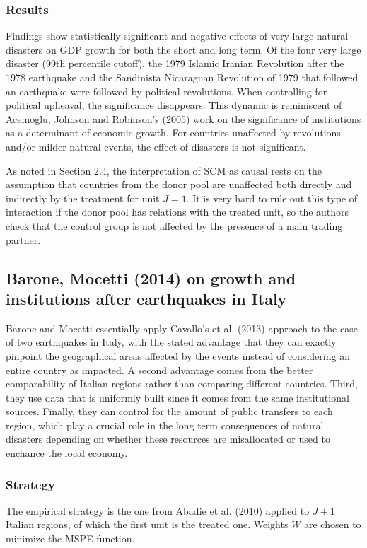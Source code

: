 \documentclass[12pt,a4paper,draft]{article}
\begin{document}
\subsubsection*{Results}
Findings show statistically significant and negative effects of very large natural disasters 
on GDP growth for both the short and long term. 
Of the four very large disaster (99th percentile cutoff), the 1979 Islamic Iranian Revolution 
after the 1978 earthquake and the Sandinista Nicaraguan Revolution of 1979 that followed an 
earthquake were followed by political revolutions.
When controlling for political upheaval, the significance disappears. This dynamic is reminiscent 
of Acemoglu, Johnson and Robinson's (2005) work on the significance of institutions as a 
determinant of economic growth.
For countries unaffected by revolutions and/or milder natural events, the effect of disasters 
is not significant. 

As noted in Section 2.4, the interpretation of SCM as causal rests on the assumption that 
countries from the donor pool are unaffected both directly and indirectly by the treatment for 
unit $J=1$. It is very hard to rule out this type of interaction if the donor pool has relations 
with the treated unit, so the authors check that the control group is not affected by the 
presence of a main trading partner.



\subsection{Barone, Mocetti (2014) on growth and institutions after earthquakes in Italy}
Barone and Mocetti essentially apply Cavallo's et al. (2013) approach to the case of two 
earthquakes in Italy, with the stated advantage that they can exactly pinpoint the geographical 
areas affected by the events instead of considering an entire country as impacted. 
A second advantage comes from the better comparability of Italian 
regions rather than comparing different countries. Third, they use data that is uniformly built 
since it comes from the same institutional sources. Finally, they can control for the amount of 
public transfers to each region, which play a crucial role in the long term consequences of 
natural disasters depending on whether these resources are misallocated or used to enchance the 
local economy.

\subsubsection*{Strategy}
The empirical strategy is the one from Abadie et al. (2010) applied to $J+1$ Italian regions, of 
which the first unit is the treated one. 
Weights $W$ are chosen to minimize the MSPE function. 
\end{document}
